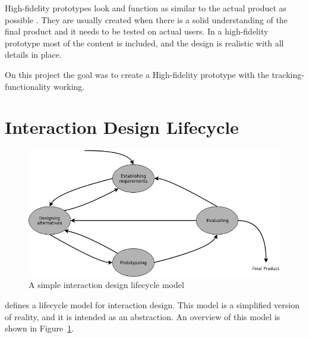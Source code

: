 \documentclass[../Main/thesis.tex]{subfiles}
\begin{document}
High-fidelity prototypes look and function as similar to the actual product as possible \citep{Babich2017}.
They are usually created when there is a solid understanding of the final product and it needs to be tested on actual users.
In a high-fidelity prototype most of the content is included, and the design is realistic with all details in place.

On this project the goal was to create a High-fidelity prototype with the tracking-functionality working. 


\section{Interaction Design Lifecycle}
\begin{figure}[h]
	\centering
	\includegraphics[width=\textwidth]{../fig/Interaction-design-lifecycle}
	\caption[A simple interaction design lifecycle model]{A simple interaction design lifecycle model\citep[p.332]{Preece2011}}
	\label{fig:interaction-design-lifecycle}
\end{figure}

\citet{Preece2011} defines a lifecycle model for interaction design.
This model is a simplified version of reality, and it is intended as an abstraction.
An overview of this model is shown in Figure~\ref{fig:interaction-design-lifecycle}.
\end{document}
